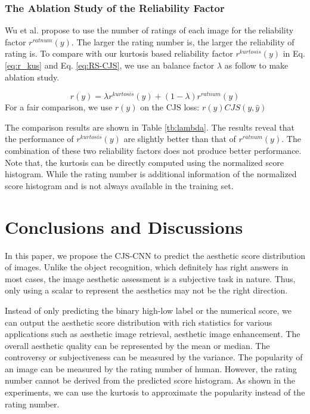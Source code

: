 \documentclass[letterpaper]{article} %
\begin{document}
\subsubsection{The Ablation Study of the Reliability Factor}
Wu et al. \cite{WuICCV2011} propose to use the number of ratings of each image for the reliability factor $r^{ratnum}(y)$. The larger the rating number is, the larger the reliability of rating is. To compare with our kurtosis based reliability factor $r^{kurtosis}(y)$ in Eq. \ref{eq:r_kus} and Eq. \ref{eq:RS-CJS}, we use an balance factor $\lambda$ as follow to make ablation study.

\begin{equation}
r(y) = \lambda r^{kurtosis}(y) + (1-\lambda) r^{ratnum}(y)
\label{eq:lambda}
\end{equation}
For a fair comparison, we use $r(y)$ on the CJS loss: $r(y) CJS(y,\hat{y})$

The comparison results are shown in Table \ref{tb:lambda}. The results reveal that the performance of $r^{kurtosis}(y)$ are slightly better than that of $r^{ratnum}(y)$. The combination of these two reliability factors does not produce better performance. Note that, the kurtosis can be directly computed using the normalized score histogram. While the rating number is additional information of the normalized score histogram and is not always available in the training set.
























\section{Conclusions and Discussions}
In this paper, we propose the CJS-CNN to predict the aesthetic score distribution of images. Unlike the object recognition, which definitely has right answers in most cases, the image aesthetic assessment is a subjective task in nature. Thus, only using a scalar to represent the aesthetics may not be the right direction.

Instead of only predicting the binary high-low label or the numerical score, we can output the aesthetic score distribution with rich statistics for various applications such as aesthetic image retrieval, aesthetic image enhancement. The overall aesthetic quality can be represented by the mean or median. The controversy or subjectiveness can be measured by the variance. The popularity of an image can be measured by the rating number of human. However, the rating number cannot be derived from the predicted score histogram. As shown in the experiments, we can use the kurtosis to approximate the popularity instead of the rating number.
\end{document}
